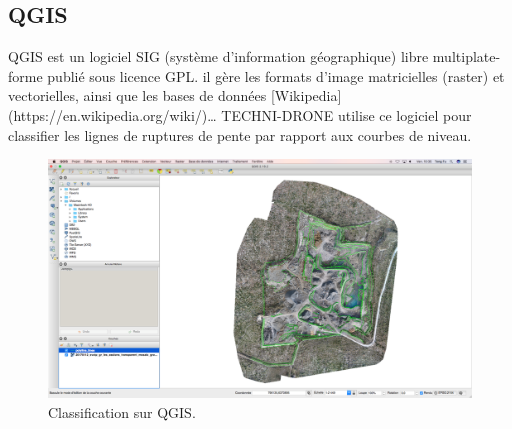 \subsection{QGIS}

QGIS est un logiciel SIG (système d'information 
géographique) libre multiplate-forme publié sous licence GPL. 
il gère les formats d’image matricielles (raster) et vectorielles,
ainsi que les bases de données [Wikipedia](https://en.wikipedia.org/wiki/)\dots
TECHNI-DRONE utilise ce logiciel pour classifier les lignes de 
ruptures de pente par rapport aux courbes de niveau.
\begin{figure}[h]
  \begin{center}
    \includegraphics[width=12cm]{images/QGIS.jpg}
     \caption{Classification sur QGIS.
     \label{QGISClassification}}
  \end{center}
\end{figure}
